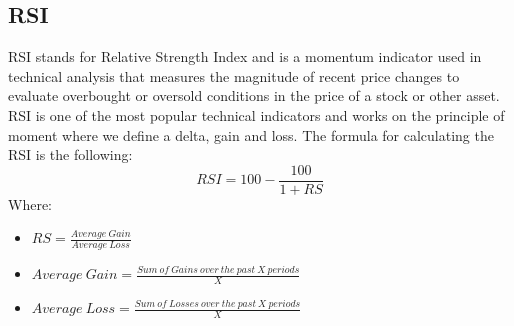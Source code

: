 \documentclass{imc-inf}
\begin{document}
		\subsection{RSI}
			RSI stands for Relative Strength Index and is a momentum indicator used in technical analysis that measures the magnitude of recent price changes to
			evaluate overbought or oversold conditions in the price of a stock or other asset. RSI is one of the most popular technical indicators
			and works on the principle of moment where we define a delta, gain and loss. The formula for calculating the RSI is the following:
			\begin{equation}
				RSI = 100 - \frac{100}{1 + RS}
			\end{equation}
			Where:
			\begin{itemize}
				\item $RS = \frac{Average\ Gain}{Average\ Loss}$
				\item $Average\ Gain = \frac{Sum\ of\ Gains\ over\ the\ past\ X\ periods}{X}$
				\item $Average\ Loss = \frac{Sum\ of\ Losses\ over\ the\ past\ X\ periods}{X}$
			\end{itemize}
\end{document}
